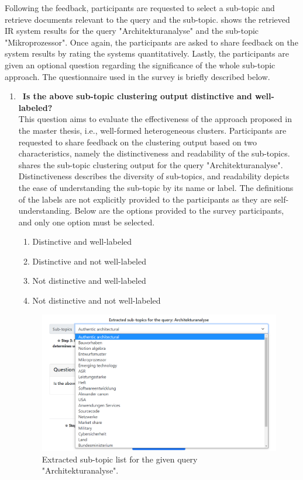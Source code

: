 Following the feedback, participants are requested to select a sub-topic and retrieve documents relevant to the query and the sub-topic.   shows the retrieved \ac{IR} system results for the query "Architekturanalyse" and the sub-topic "Mikroprozessor". Once again, the participants are asked to share feedback on the system results by rating the systems quantitatively. Lastly, the participants are given an optional question regarding the significance of the whole sub-topic approach. The questionnaire used in the survey is briefly described below.


\begin{enumerate}
	\item ~\textbf{Is the above sub-topic clustering output distinctive and well-labeled?} \\
	
This question aims to evaluate the effectiveness of the approach proposed in the master thesis, i.e., well-formed heterogeneous clusters. Participants are requested to share feedback on the clustering output based on two characteristics, namely the distinctiveness and readability of the sub-topics.  shares the sub-topic clustering output for the query "Architekturanalyse". Distinctiveness describes the diversity of sub-topics, and readability depicts the ease of understanding the sub-topic by its name or label. The definitions of the labels are not explicitly provided to the participants as they are self-understanding. Below are the options provided to the survey participants, and only one option must be selected.

	
	\begin{enumerate}
		\item Distinctive and well-labeled
		\item Distinctive and not well-labeled
		\item Not distinctive and well-labeled
		\item Not distinctive and not well-labeled
	\end{enumerate}
	
	
	\begin{figure}[h]
		\centering
		\includegraphics[width=.8\textwidth]{images/survey/sub-topic-output.png}
		\caption[Sub-topic list example.]{Extracted sub-topic list for the given query "Architekturanalyse". \label{fig:sub_topic_output}}
	\end{figure}
	

\end{enumerate}
